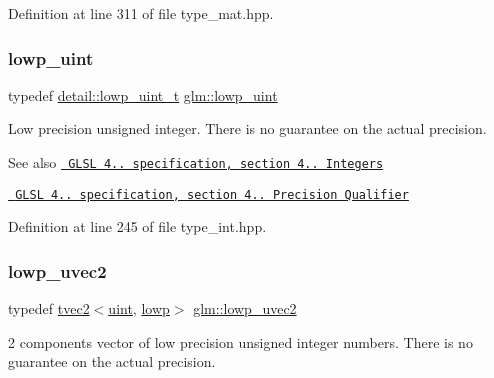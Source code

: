 Definition at line 311 of file type\+\_\+mat.\+hpp.

\mbox{\label{group__core__precision_ga8077c90f2c87e419ea6c273157dcc1fc}} 
\subsubsection{\texorpdfstring{lowp\_uint}{lowp\_uint}}
{\footnotesize\ttfamily typedef \mbox{\hyperlink{namespaceglm_1_1detail_ad59c4581ad8ce0c3ef6146edaa7e15dc}{detail\+::lowp\+\_\+uint\+\_\+t}} \mbox{\hyperlink{group__core__precision_ga8077c90f2c87e419ea6c273157dcc1fc}{glm\+::lowp\+\_\+uint}}}

Low precision unsigned integer. There is no guarantee on the actual precision.

\begin{DoxySeeAlso}{See also}
\href{http://www.opengl.org/registry/doc/GLSLangSpec.4.20.8.pdf}{\texttt{ G\+L\+SL 4.. specification, section 4.. Integers}} 

\href{http://www.opengl.org/registry/doc/GLSLangSpec.4.20.8.pdf}{\texttt{ G\+L\+SL 4.. specification, section 4.. Precision Qualifier}} 
\end{DoxySeeAlso}


Definition at line 245 of file type\+\_\+int.\+hpp.

\mbox{\label{group__core__precision_ga0eec567054355374c84c7971a07d274c}} 
\subsubsection{\texorpdfstring{lowp\_uvec2}{lowp\_uvec2}}
{\footnotesize\ttfamily typedef \mbox{\hyperlink{structglm_1_1tvec2}{tvec2}}$<$\mbox{\hyperlink{group__core__precision_ga4fd29415871152bfb5abd588334147c8}{uint}}, \mbox{\hyperlink{namespaceglm_a0f04f086094c747d227af4425893f545ae161af3fc695e696ce3bf69f7332bc2d}{lowp}}$>$ \mbox{\hyperlink{group__core__precision_ga0eec567054355374c84c7971a07d274c}{glm\+::lowp\+\_\+uvec2}}}

2 components vector of low precision unsigned integer numbers. There is no guarantee on the actual precision.

